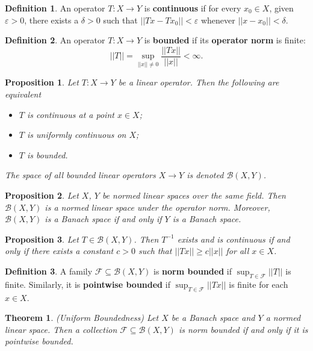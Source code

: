 \documentclass[11pt]{amsart}
\newtheorem*{theorem*}{Theorem}
\newtheorem*{proposition*}{Proposition}
\theoremstyle{definition}
\newtheorem*{definition*}{Definition}
\renewcommand\geq{\geqslant}
\renewcommand\:{\colon}
\newcommand{\calB}{\mathcal{B}}
\newcommand{\calF}{\mathcal{F}}
\begin{document}
\begin{definition*}
	An operator $T\: X \to Y$ is \textbf{continuous} if for every $x_0 \in X$, given $\varepsilon > 0$, there exists a $\delta > 0$ such that $||Tx - Tx_0|| < \varepsilon$ whenever $||x - x_0|| < \delta$.
\end{definition*}

\begin{definition*}
	An operator $T\: X \to Y$ is \textbf{bounded} if its \textbf{operator norm} is finite:
		\[ ||T|| = \sup_{||x|| \neq 0} \frac{||Tx||}{||x||} < \infty. \]
\end{definition*}

\begin{proposition*}
	Let $T\: X \to Y$ be a linear operator. Then the following are equivalent
	\begin{itemize}[leftmargin=32.5pt]\setlength\itemsep{0em}
		\item[\textnormal{(i)}] $T$ is continuous at a point $x \in X$;
		\item[\textnormal{(ii)}] $T$ is uniformly continuous on $X$;
		\item[\textnormal{(iii)}] $T$ is bounded.
	\end{itemize}
	The space of all bounded linear operators $X \to Y$ is denoted $\calB(X, Y)$.
\end{proposition*}

\begin{proposition*}
	Let $X$, $Y$ be normed linear spaces over the same field. Then $\calB(X, Y)$ is a normed linear space under the operator norm. Moreover, $\calB(X, Y)$ is a Banach space if and only if $Y$ is a Banach space.
\end{proposition*}

\begin{proposition*}
	Let $T \in \calB(X, Y)$. Then $T^{-1}$ exists and is continuous if and only if there exists a constant $c > 0$ such that $||Tx|| \geq c||x||$ for all $x \in X$.
\end{proposition*}

\begin{definition*}
	A family $\calF \subseteq \calB(X,Y)$ is \textbf{norm bounded} if $\sup_{T \in \calF} ||T||$ is finite. Similarly, it is \textbf{pointwise bounded} if $\sup_{T \in \calF} ||Tx||$ is finite for each $x \in X$.
\end{definition*}

\begin{theorem*}
	\textnormal{(Uniform Boundedness)} Let $X$ be a Banach space and $Y$ a normed linear space. Then a collection $\calF \subseteq \calB(X,Y)$ is norm bounded if and only if it is pointwise bounded.
\end{theorem*}
\end{document}
